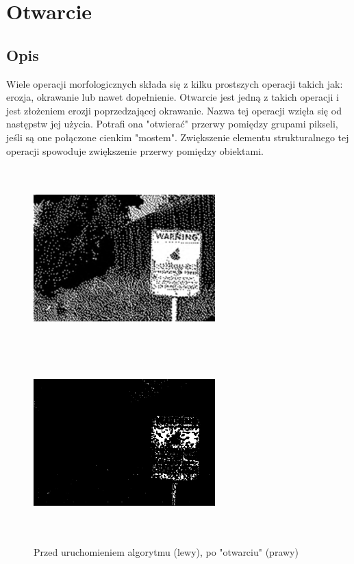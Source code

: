 \documentclass[a4paper,12pt]{book}
\begin{document}
\section{Otwarcie}
\subsection{Opis}
Wiele operacji morfologicznych składa się z kilku prostszych operacji takich jak: erozja, okrawanie lub nawet dopełnienie. Otwarcie jest jedną z takich operacji i jest złożeniem erozji poprzedzającej okrawanie. Nazwa tej operacji wzięła się od następstw jej użycia. Potrafi ona "otwierać" przerwy pomiędzy grupami pikseli, jeśli są one połączone cienkim "mostem". Zwiększenie elementu strukturalnego tej operacji spowoduje zwiększenie przerwy pomiędzy obiektami. 
\begin{figure}[H]
	\caption{Przed uruchomieniem algorytmu (lewy), po "otwarciu" (prawy)}
	\includegraphics[width=7cm, height=7cm]{binary-unmodified.png}
	\includegraphics[width=7cm, height=7cm]{binary-opening.png}
\end{figure}
\end{document}
